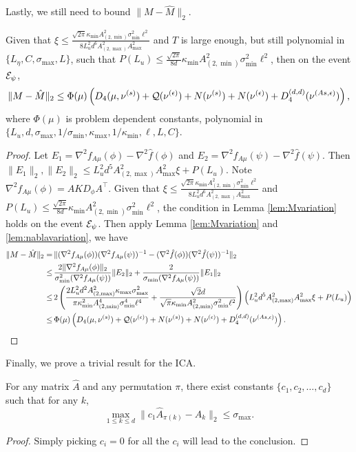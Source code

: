 Lastly, we still need to bound $\|M - \hat{M}\|_2$.
\begin{lemma}
\label{lem:Mvariation_alg}
Given that  $\xi \le  \frac{\sqrt{2\pi}\kappa_{\min}A^2_{(2,\min)}\sigma_{\min}^2\ell^2}{8L_u^2d^6 A_{(2,\max)}^2A_{\max}^2}$ and $T$  is large enough, but still polynomial in $\{L_\eta, C, \sigma_{\max}, L\}$, such that $P(L_u) \le \frac{\sqrt{2\pi}}{8d}\kappa_{\min}A^2_{(2,\min)}\sigma_{\min}^2\ell^2$, then on the event $\mathcal{E}_{\psi}$, 
\[ 
\|M - \hat{M}\|_2 \le \Phi(\mu)\left( D_4(\mu, \nu^{(s)} )+ \mathcal{Q}(\nu^{(\epsilon)}) + N(\nu^{(s)})+ N(\nu^{(\epsilon)})+ D_4^{(d,d)}(\nu^{(As,\epsilon)}) \right),
\]
where $\Phi(\mu)$ is problem dependent constants, polynomial in
$\{L_u, d, \sigma_{\max}, 1/\sigma_{\min}, \kappa_{\max}, 1/\kappa_{\min}, \ell, L ,C\}$.
\end{lemma}
\begin{proof}
Let $E_1 = \nabla^2 f_{A\mu}(\phi) - \nabla^2 \hat{f}(\phi)$ and $ E_2 = \nabla^2 f_{A\mu}(\psi) - \nabla^2 \hat{f}(\psi)$. Then $\|E_1\|_2 , \|E_2\|_2 \le L_u^2d^5 A_{(2,\max)}^2A_{\max}^2\xi + P(L_u)$.
Note $\nabla^2f_{A\mu}(\phi) = AKD_{\phi} A^{\top}$.
Given that 
$\xi \le  \frac{\sqrt{2\pi}\kappa_{\min}A^2_{(2,\min)}\sigma_{\min}^2\ell^2}{8L_u^2d^6 A_{(2,\max)}^2A_{\max}^2}$ 
and $P(L_u) \le \frac{\sqrt{2\pi}}{8d}\kappa_{\min}A^2_{(2,\min)}\sigma_{\min}^2\ell^2$, the condition in Lemma \ref{lem:Mvariation} holds on the event $\mathcal{E}_{\psi}$. 
Then apply Lemma \ref{lem:Mvariation} and \ref{lem:nablavariation}, we have
\begin{align*}
\|M - \hat{M}\|_2 =\, & \|(\nabla^2 f_{A\mu}(\phi))(\nabla^2f_{A\mu}(\psi))^{-1} - (\nabla^2 \hat{f}(\phi))(\nabla^2\hat{f}(\psi))^{-1} \|_2 \\
\le \, &\frac{2\|\nabla^2 f_{A\mu}(\phi)\|_2}{\sigma_{\min}^2(\nabla^2f_{A\mu}(\psi))}\|E_2\|_2 + \frac{2}{\sigma_{\min}(\nabla^2f_{A\mu}(\psi))}\|E_1\|_2 \\
\le \, & 2\left( \frac{2L_u^2d^2A_{(2,\max)}^2\kappa_{\max}\sigma_{\max}^2}{\pi\kappa^2_{\min}A^4_{(2,\min)}\sigma_{\min}^4\ell^4} + 
\frac{\sqrt{2}d}{\sqrt{\pi}\kappa_{\min}A^2_{(2,\min)}\sigma_{\min}^2\ell^2}
\right)\left(L_u^2d^5 A_{(2,\max)}^2A_{\max}^2\xi + P(L_u)\right) \\
\le \, &\Phi(\mu)\left( D_4(\mu, \nu^{(s)} )+ \mathcal{Q}(\nu^{(\epsilon)}) + N(\nu^{(s)})+ N(\nu^{(\epsilon)})+ D_4^{(d,d)}(\nu^{(As,\epsilon)}) \right).
\end{align*}
\end{proof}

Finally, we prove a trivial result for the ICA.
\begin{prop}
\label{prop:trivialres}
For any matrix $\hat{A}$ and any permutation $\pi$, there exist constants $\{c_1, c_2, \ldots, c_d\}$ such that for any $k$,
\[
\max_{1\le k\le d}\| c_1\hat{A}_{\pi(k)} - A_k\|_2 \le \sigma_{\max}.
\]
\end{prop}
\begin{proof}
Simply picking $c_i = 0$ for all the $c_i$ will lead to the conclusion.
\end{proof}

